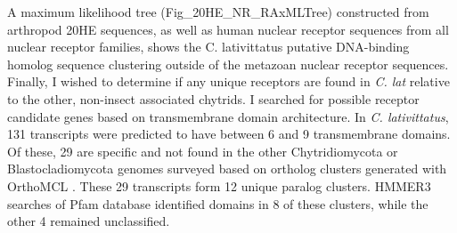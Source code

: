 \indent A maximum likelihood tree (Fig\_20HE\_NR\_RAxMLTree) constructed from arthropod 20HE sequences, as well as human nuclear receptor sequences from all nuclear receptor families, shows the C. lativittatus putative DNA-binding homolog sequence clustering outside of the metazoan nuclear receptor sequences. \\
\indent Finally, I wished to determine if any unique receptors are found in \textit{C. lat} relative to the other, non-insect associated chytrids. I searched for possible receptor candidate genes based on transmembrane domain architecture. In \textit{C. lativittatus}, 131 transcripts were predicted to have between 6 and 9 transmembrane domains. Of these, 29 are specific and not found in the other Chytridiomycota or Blastocladiomycota genomes surveyed based on ortholog clusters generated with OrthoMCL \cite{Li2003}. These 29 transcripts form 12 unique paralog clusters. HMMER3 searches of Pfam database identified domains in 8 of these clusters, while the other 4 remained unclassified.\\
